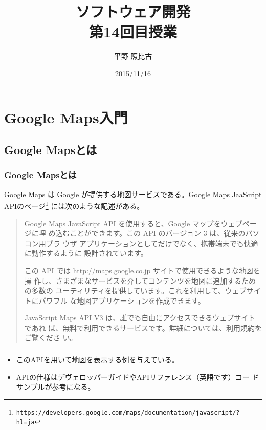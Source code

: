 \documentclass[dvipsk]{beamer}
\title{ソフトウェア開発\\第14回目授業}
\author{平野 照比古}
\institute{}
\date{2015/11/16}
\begin{document}
\frame{\maketitle}
\section{Google Maps入門}
\subsection{Google Mapsとは}
\begin{frame}[containsverbatim]
\frametitle{Google Mapsとは}
Google Maps は Google が提供する地図サービスである。Google Maps
JaaScript APIのページ\footnote{
\texttt{https://developers.google.com/maps/documentation/javascript/?hl=ja}}
には次のような記述がある。
\begin{quotation}
 Google Maps JavaScript API を使用すると、Google マップをウェブページに埋
 め込むことができます。この API のバージョン 3 は、従来のパソコン用ブラ
 ウザ アプリケーションとしてだけでなく、携帯端末でも快適に動作するように
 設計されています。 

この API では http://maps.google.co.jp サイトで使用できるような地図を操
 作し、さまざまなサービスを介してコンテンツを地図に追加するための多数の
 ユーティリティを提供しています。これを利用して、ウェブサイトにパワフル
 な地図アプリケーションを作成できます。 

JavaScript Maps API V3 は、誰でも自由にアクセスできるウェブサイトであれ
 ば、無料で利用できるサービスです。詳細については、利用規約をご覧くださ
 い。
\end{quotation}
\end{frame}
\begin{frame}[containsverbatim]
\frametitle{}
\begin{itemize}
 \item このAPIを用いて地図を表示する例を与えている。
 \item APIの仕様はデヴェロッパーガイドやAPIリファレンス（英語です）コー
       ドサンプルが参考になる。
\end{itemize}
\end{frame}
\end{document}
